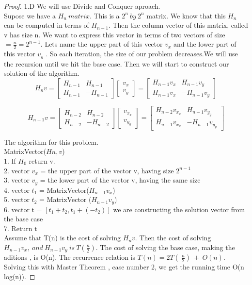 \documentclass[11 pt]{article}
\begin{document}
\begin{proof}

1.D We will use Divide and Conquer aproach.\\
Supose we have a $H_n\ matrix$. This is a $2^n  \ by \ 2^n$ matrix. We know that this $H_n$ can be computed in terms of $H_{n-1}$. Then the column vector of this matrix, called v has size n. We want to express this vector in terms of two vectors of size $=\frac{n}{2} = 2^{n-1}$. Lets name the upper part of this vector $v_x$ and the lower part of this vector $v_y$ . So each iteration, the size of our problem decreases.We will use the recursion until we hit the base case. Then we will start to construct our solution of the algorithm. 
\[
H_n v = 
\begin{bmatrix}
H_{n-1} & H_{n-1}\\
H_{n-1} & -H_{n-1}
\end{bmatrix}
\begin{bmatrix}
v_x\\
v_y
\end{bmatrix}
= 
\begin{bmatrix}
H_{n-1}v_x & H_{n-1}v_y\\
H_{n-1}v_x & -H_{n-1}v_y
\end{bmatrix}
\]


\[
H_{n-1} v = 
\begin{bmatrix}
H_{n-2} & H_{n-2}\\
H_{n-2} & -H_{n-2}
\end{bmatrix}
\begin{bmatrix}
v_{x_x}\\
v_{y_y}
\end{bmatrix}
= 
\begin{bmatrix}
H_{n-2}v_{x_x} & H_{n-1}v_{y_y}\\
H_{n-1}v_{x_x} & -H_{n-1}v_{y_y}
\end{bmatrix}
\]

The algorithm for this problem.\\

MatrixVector($Hn, v$)\\
1. If $H_0$ return v.\\
2. vector $v_x$ = the upper part of the vector v, having size $2^{n-1}$\\
3. vector $v_y$ = the lower part of the vector v, having the same size\\
4. vector $t_1$ = MatrixVector($H_{n-1} v_x$)\\
5. vector $t_2$ = MatrixVector ($H_{n-1}v_y$)\\
6. vector t = $[t_1 + t_2, t_1 + (-t_2) ]$ we are constructing the solution vector from the base case\\
7. Return t \\

Assume that T(n) is the cost of solving $H_n v$. Then the cost of solving $H_{n-1}v_x,  \ and \ H_{n-1}v_y \ is  \ T(\frac{n}{2})$. The cost of solving the base case, making the aditions , is O(n). The recurrence relation is $T(n) = 2T( \ \frac{n}{2}) \ + \ O(n)$. Solving this with Master Theorem , case number 2, we get the running time O(n log(n)).
\end{proof}
\end{document}
